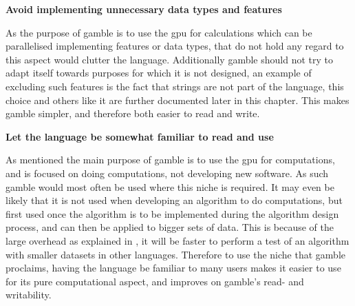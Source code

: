 \textbf{Avoid implementing unnecessary data types and features}

As the purpose of \gls{gamble} is to use the \acrshort{gpu} for calculations which can be parallelised implementing features or data types, that do not hold any regard to this aspect would clutter the language.
Additionally \gls{gamble} should not try to adapt itself towards purposes for which it is not designed, an example of excluding such features is the fact that strings are not part of the language, this choice and others like it are further documented later in this chapter.
This makes \gls{gamble} simpler, and therefore both easier to read and write.

\textbf{Let the language be somewhat familiar to read and use}

As mentioned the main purpose of \gls{gamble} is to use the \acrshort{gpu} for computations, and is focused on doing computations, not developing new software.
As such \gls{gamble} would most often be used where this niche is required.
It may even be likely that it is not used when developing an algorithm to do computations, but first used once the algorithm is to be implemented during the algorithm design process, and can then be applied to bigger sets of data. \citep{AlgorithmDesign}
This is because of the large overhead as explained in , it will be faster to perform a test of an algorithm with smaller datasets in other languages.
Therefore to use the niche that \gls{gamble} proclaims, having the language be familiar to many users makes it easier to use for its pure computational aspect, and improves on \gls{gamble}'s read- and writability.

